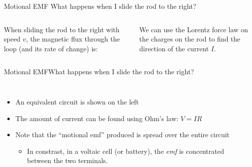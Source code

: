 \documentclass[12pt,aspectratio=169]{beamer}
\begin{document}
\begin{frame}{Motional EMF}
  {What happens when I slide the rod to the right?}
  \begin{columns}

    When sliding the rod to the right with speed $v$, the magnetic flux through
    the loop (and its rate of change) is:

    
    \vspace{-.3in}We can use the Lorentz force law on the charges on the rod to
    find the direction of the current $I$.
  \end{columns}
\end{frame}



\begin{frame}{Motional EMF}{What happens when I slide the rod to the right?}
  \begin{columns}
    
    \begin{itemize}
    \item An equivalent circuit is shown on the left
    \item The amount of current can be found using Ohm's law: $V=IR$
    \item Note that the ``motional emf'' produced is spread over the entire
      circuit
      \begin{itemize}
      \item In constrast, in a voltaic cell (or battery), the \emph{emf} is
        concentrated between the two terminals.
      \end{itemize}
    \end{itemize}
  \end{columns}
\end{frame}
\end{document}
